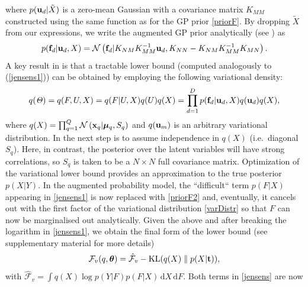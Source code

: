 \documentclass{article} %
\begin{document}
where $p(\mathbf{u}_d | \tilde{X})$ is a zero-mean Gaussian with a
covariance matrix $K_{MM}$ constructed using the same function as for
the GP prior \eqref{priorF}. By dropping $\tilde{X}$ from our
expressions, we write the augmented GP prior analytically (see
\cite{rasmussen-williams}) as
\begin{equation}
 \label{priorF2}
p(\mathbf{f}_d | \mathbf{u}_d, X) =  \mathcal{N}  \left( \mathbf{f}_d | K_{NM} K_{MM}^{-1} \mathbf{u}_d , K_{NN} - K_{NM} K_{MM}^{-1} K_{MN} \right).
\end{equation}
A key result in \cite{BayesianGPLVM}
 is that a tractable lower bound 
(computed analogously to (\ref{jensens1})) can be obtained by employing the following variational density:
\begin{equation}
\label{varDistr}
q(\mathit{\Theta}) = q(F, U,X) = q(F | U, X) q(U) q(X) = \prod_{d=1}^D p(\mathbf{f}_d | \mathbf{u}_d, X )q(\mathbf{u}_d) q(X),
\end{equation}
%
where $q(X) = \prod_{q=1}^Q \mathcal{N} \left( \mathbf{x}_q | \boldsymbol \mu_q, S_q
\right)$ and $q(\mathbf{u}_m)$ is an arbitrary variational distribution. 
In  \cite{BayesianGPLVM} the next step is to assume
independence in $q(X)$ (i.e.\ diagonal $S_q$). Here, in contrast, 
the posterior over the latent variables will have strong correlations, 
so $S_q$ is taken to be a $N \times N$ full covariance
matrix. Optimization of the variational lower bound provides 
an approximation to the true posterior $p(X|Y)$.
%
In the augmented probability model, the ``difficult`` term $p(F | X)$ appearing in \eqref{jensens1} is now replaced with \eqref{priorF2} and, eventually, it cancels out with the first factor of the variational distribution \eqref{varDistr} so that $F$ can now be marginalised out analytically.
% 
%
 Given the above and after breaking the logarithm in \eqref{jensens1}, we obtain the final form of the lower bound (see supplementary material for more details)
%
\begin{equation}
\label{jensens}
\mathcal{F}_v(q, \boldsymbol \theta) = 
\hat{\mathcal{F}}_v - \text{KL}(q(X) \parallel p(X|\mathbf{t})),
\end{equation}
%
with $\hat{\mathcal{F}}_v =\int q(X) \log p( Y | F ) p( F | X) \,
\mathrm{d} X \,\mathrm{d}F$. Both terms in \eqref{jensens} are now
\end{document}
